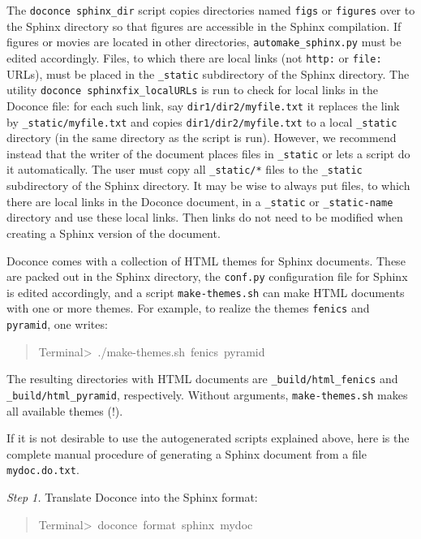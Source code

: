 \documentclass[a4paper]{article}
\begin{document}
The \texttt{doconce sphinx\_dir} script copies directories named \texttt{figs} or
\texttt{figures} over to the Sphinx directory so that figures are accessible
in the Sphinx compilation.  If figures or movies are located in other
directories, \texttt{automake\_sphinx.py} must be edited accordingly.  Files,
to which there are local links (not \texttt{http:} or \texttt{file:} URLs), must be
placed in the \texttt{\_static} subdirectory of the Sphinx directory. The
utility \texttt{doconce sphinxfix\_localURLs} is run to check for local links
in the Doconce file: for each such link, say \texttt{dir1/dir2/myfile.txt} it
replaces the link by \texttt{\_static/myfile.txt} and copies
\texttt{dir1/dir2/myfile.txt} to a local \texttt{\_static} directory (in the same
directory as the script is run).  However, we recommend instead that
the writer of the document places files in \texttt{\_static} or lets a script
do it automatically. The user must copy all \texttt{\_static/*} files to the
\texttt{\_static} subdirectory of the Sphinx directory.  It may be wise to
always put files, to which there are local links in the Doconce
document, in a \texttt{\_static} or \texttt{\_static-name} directory and use these
local links. Then links do not need to be modified when creating a
Sphinx version of the document.

Doconce comes with a collection of HTML themes for Sphinx documents.
These are packed out in the Sphinx directory, the \texttt{conf.py}
configuration file for Sphinx is edited accordingly, and a script
\texttt{make-themes.sh} can make HTML documents with one or more themes.
For example,
to realize the themes \texttt{fenics} and \texttt{pyramid}, one writes:
%
\begin{quote}{\ttfamily \raggedright \noindent
Terminal>~./make-themes.sh~fenics~pyramid
}
\end{quote}

The resulting directories with HTML documents are \texttt{\_build/html\_fenics}
and \texttt{\_build/html\_pyramid}, respectively. Without arguments,
\texttt{make-themes.sh} makes all available themes (!).

If it is not desirable to use the autogenerated scripts explained
above, here is the complete manual procedure of generating a
Sphinx document from a file \texttt{mydoc.do.txt}.

\emph{Step 1.} Translate Doconce into the Sphinx format:
%
\begin{quote}{\ttfamily \raggedright \noindent
Terminal>~doconce~format~sphinx~mydoc
}
\end{quote}
\end{document}
